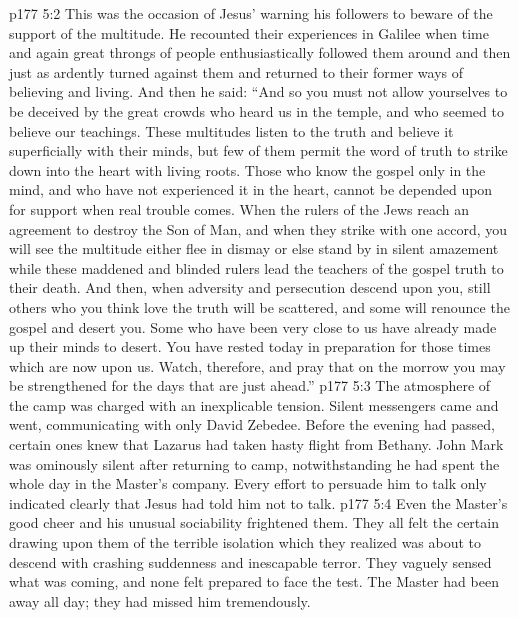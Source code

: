 \vs p177 5:2 This was the occasion of Jesus’ warning his followers to beware of the support of the multitude. He recounted their experiences in Galilee when time and again great throngs of people enthusiastically followed them around and then just as ardently turned against them and returned to their former ways of believing and living. And then he said: “And so you must not allow yourselves to be deceived by the great crowds who heard us in the temple, and who seemed to believe our teachings. These multitudes listen to the truth and believe it superficially with their minds, but few of them permit the word of truth to strike down into the heart with living roots. Those who know the gospel only in the mind, and who have not experienced it in the heart, cannot be depended upon for support when real trouble comes. When the rulers of the Jews reach an agreement to destroy the Son of Man, and when they strike with one accord, you will see the multitude either flee in dismay or else stand by in silent amazement while these maddened and blinded rulers lead the teachers of the gospel truth to their death. And then, when adversity and persecution descend upon you, still others who you think love the truth will be scattered, and some will renounce the gospel and desert you. Some who have been very close to us have already made up their minds to desert. You have rested today in preparation for those times which are now upon us. Watch, therefore, and pray that on the morrow you may be strengthened for the days that are just ahead.”
\vs p177 5:3 The atmosphere of the camp was charged with an inexplicable tension. Silent messengers came and went, communicating with only David Zebedee. Before the evening had passed, certain ones knew that Lazarus had taken hasty flight from Bethany. John Mark was ominously silent after returning to camp, notwithstanding he had spent the whole day in the Master’s company. Every effort to persuade him to talk only indicated clearly that Jesus had told him not to talk.
\vs p177 5:4 Even the Master’s good cheer and his unusual sociability frightened them. They all felt the certain drawing upon them of the terrible isolation which they realized was about to descend with crashing suddenness and inescapable terror. They vaguely sensed what was coming, and none felt prepared to face the test. The Master had been away all day; they had missed him tremendously.
